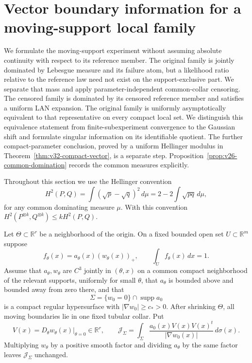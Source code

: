 \section{Vector boundary information for a moving-support local family}
\label{sec:v22-vector-information}

We formulate the moving-support experiment without assuming absolute
continuity with respect to its reference member.  The original family is
jointly dominated by Lebesgue measure and its failure atom, but a likelihood
ratio relative to the reference law need not exist on the support-exclusive
part.  We separate that mass and apply parameter-independent common-collar
censoring.  The censored family is dominated by its censored reference member
and satisfies a uniform LAN expansion.  The original family is uniformly
asymptotically equivalent to that representative on every compact local set.
We distinguish this equivalence statement from finite-subexperiment
convergence to the Gaussian shift and formulate singular information on its
identifiable quotient.  The further compact-parameter conclusion, proved
by a uniform Hellinger modulus in Theorem~\ref{thm:v32-compact-vector},
is a separate step.  Proposition~\ref{prop:v26-common-domination} records
the common measures explicitly.

Throughout this section we use the Hellinger convention
\begin{equation}\label{eq:v22-hellinger-convention}
 H^2(P,Q)=\int(\sqrt p-\sqrt q)^2\,d\mu
        =2-2\int\sqrt{pq}\,d\mu,
\end{equation}
for any common dominating measure $\mu$.  With this convention
$H^2(P^{\otimes k},Q^{\otimes k})\le kH^2(P,Q)$.

Let $\Theta\subset\mathbb R^r$ be a neighborhood of the origin.  On a fixed
bounded open set $U\subset\mathbb R^m$ suppose
\begin{equation}\label{eq:v22-vector-density}
 f_\theta(x)=a_\theta(x)(w_\theta(x))_+,
 \qquad \int_U f_\theta(x)\,dx=1.
\end{equation}
Assume that $a_\theta,w_\theta$ are $C^3$ jointly in $(\theta,x)$ on a
common compact neighborhood of the relevant supports, uniformly for small
$\theta$, that $a_\theta$ is bounded above and bounded away from zero there,
and that
\[
 \Sigma=\{w_0=0\}\cap\operatorname{supp}a_0
\]
is a compact regular hypersurface with $|\nabla w_0|\ge c_*>0$.  After
shrinking $\Theta$, all moving boundaries lie in one fixed tubular collar.
Put
\begin{equation}\label{eq:v22-boundary-velocity-matrix}
 V(x)=D_\theta w_\theta(x)|_{\theta=0}\in\mathbb R^r,
 \qquad
 \mathcal J_\Sigma=
 \int_\Sigma\frac{a_0(x)V(x)V(x)^t}{|\nabla w_0(x)|}\,d\sigma(x).
\end{equation}
Multiplying $w_\theta$ by a positive smooth factor and dividing
$a_\theta$ by the same factor leaves $\mathcal J_\Sigma$ unchanged.

